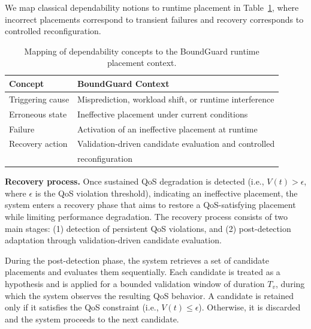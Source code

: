 \documentclass[conference]{IEEEtran}
\begin{document}
We map classical dependability notions to runtime placement in Table~\ref{tab:dependability_mapping}, where incorrect placements correspond to transient failures and recovery corresponds to controlled reconfiguration.


\begin{table}[t]
\centering
\caption{Mapping of dependability concepts to the BoundGuard runtime placement context.}
\label{tab:dependability_mapping}
\begin{tabular}{@{}l l@{}}
\toprule
\textbf{Concept} & \textbf{BoundGuard Context} \\
\midrule
Triggering cause & Misprediction, workload shift, or runtime interference \\
Erroneous state & Ineffective placement under current conditions \\
Failure & Activation of an ineffective placement at runtime \\
Recovery action & Validation-driven candidate evaluation and controlled \\
 & reconfiguration \\
\bottomrule
\end{tabular}
\end{table}

\noindent\textbf{Recovery process.} 
Once sustained QoS degradation is detected (i.e., $V(t) > \epsilon$, where $\epsilon$ is the QoS violation threshold), indicating an ineffective placement, the system enters a recovery phase that aims to restore a QoS-satisfying placement while limiting performance degradation. 
The recovery process consists of two main stages: (1) detection of persistent QoS violations, and (2) post-detection adaptation through validation-driven candidate evaluation.

During the post-detection phase, the system retrieves a set of candidate placements and evaluates them sequentially. 
Each candidate is treated as a hypothesis and is applied for a bounded validation window of duration $T_v$, during which the system observes the resulting QoS behavior. 
A candidate is retained only if it satisfies the QoS constraint (i.e., $V(t) \le \epsilon$). Otherwise, it is discarded and the system proceeds to the next candidate.
\end{document}
